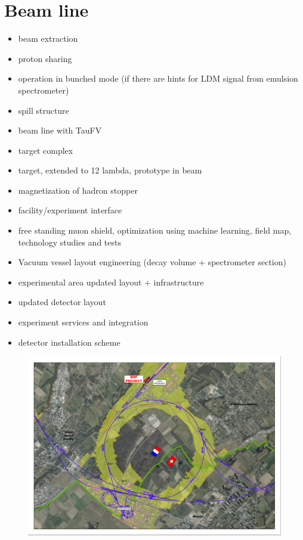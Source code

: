 \section{Beam line}
\label{sec:beamline}

\begin{itemize}
    \item beam extraction
    \item proton sharing
    \item operation in bunched mode (if	there are hints for LDM
    signal from emulsion spectrometer)	
    \item spill structure
    \item beam line with TauFV
    \item target complex
    \item target, extended to 12 lambda, prototype in beam
    \item magnetization of hadron stopper
    \item facility/experiment interface
    \item free standing muon shield, optimization using machine learning, field map, technology studies and tests
    \item Vacuum vessel layout engineering (decay volume + spectrometer section)
    \item experimental area updated layout + infrastructure
    \item updated detector layout
    \item experiment services and integration
    \item detector installation scheme
\end{itemize}

\begin{figure}[th]
\centering
\includegraphics[width=1.0\columnwidth]{figs/BeamLine/20180529-BDF-General_figure_for_BDF_paper.pdf}
\caption{}
\label{fig:FacilityLocation}
\end{figure}

